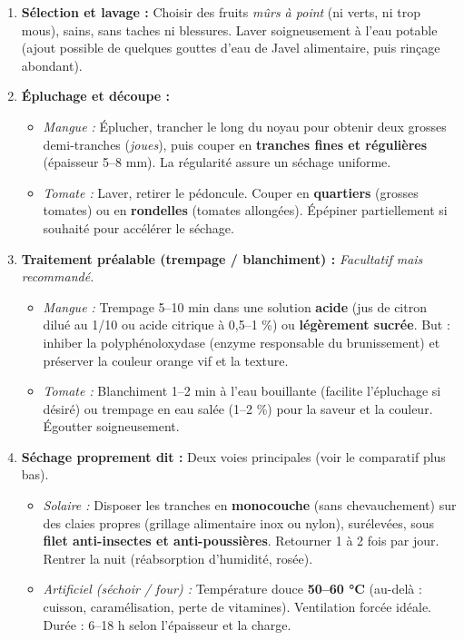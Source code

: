 \documentclass[11pt]{article}
\newcommand{\cle}[1]{{\popxbold\color{popdark}#1}}
\begin{document}
\begin{methode}
\begin{enumerate}
    \item \textbf{Sélection et lavage :} Choisir des fruits \emph{mûrs à point} (ni verts, ni trop mous), sains, sans taches ni blessures. Laver soigneusement à l'eau potable (ajout possible de quelques gouttes d'eau de Javel alimentaire, puis rinçage abondant).
    \item \textbf{Épluchage et découpe :}
    \begin{itemize}
        \item \emph{Mangue :} Éplucher, trancher le long du noyau pour obtenir deux grosses demi-tranches (\emph{joues}), puis couper en \textbf{tranches fines et régulières} (épaisseur 5--8 mm). La régularité assure un séchage uniforme.
        \item \emph{Tomate :} Laver, retirer le pédoncule. Couper en \textbf{quartiers} (grosses tomates) ou en \textbf{rondelles} (tomates allongées). Épépiner partiellement si souhaité pour accélérer le séchage.
    \end{itemize}
    \item \textbf{Traitement préalable (trempage / blanchiment) :} \emph{Facultatif mais recommandé.}
    \begin{itemize}
        \item \emph{Mangue :} Trempage 5--10 min dans une solution \textbf{acide} (jus de citron dilué au 1/10 ou acide citrique à 0,5--1 \%) ou \textbf{légèrement sucrée}. But : inhiber la \cle{polyphénoloxydase} (enzyme responsable du brunissement) et préserver la couleur orange vif et la texture.
        \item \emph{Tomate :} Blanchiment 1--2 min à l'eau bouillante (facilite l'épluchage si désiré) ou trempage en eau salée (1--2 \%) pour la saveur et la couleur. Égoutter soigneusement.
    \end{itemize}
    \item \textbf{Séchage proprement dit :} Deux voies principales (voir le comparatif plus bas).
    \begin{itemize}
        \item \emph{Solaire :} Disposer les tranches en \textbf{monocouche} (sans chevauchement) sur des claies propres (grillage alimentaire inox ou nylon), surélevées, sous \textbf{filet anti-insectes et anti-poussières}. Retourner 1 à 2 fois par jour. Rentrer la nuit (réabsorption d'humidité, rosée).
        \item \emph{Artificiel (séchoir / four) :} Température douce \textbf{50--60 °C} (au-delà : cuisson, caramélisation, perte de vitamines). Ventilation forcée idéale. Durée : 6--18 h selon l'épaisseur et la charge.

\end{itemize}
\end{enumerate}
\end{methode}
\end{document}
